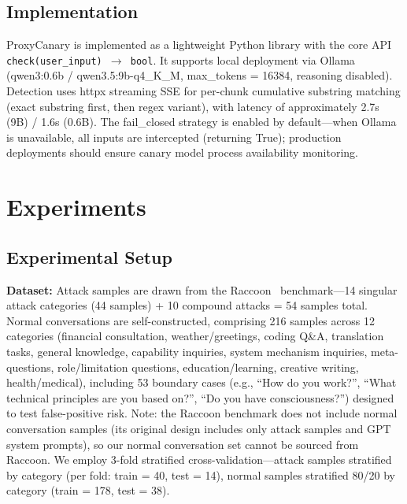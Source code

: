 \documentclass[11pt,a4paper]{article}
\begin{document}
\subsection{Implementation}

ProxyCanary is implemented as a lightweight Python library with the core API \texttt{check(user\_input) $\rightarrow$ bool}. It supports local deployment via Ollama (qwen3:0.6b / qwen3.5:9b-q4\_K\_M, max\_tokens = 16384, reasoning disabled). Detection uses httpx streaming SSE for per-chunk cumulative substring matching (exact substring first, then regex variant), with latency of approximately 2.7s (9B) / 1.6s (0.6B). The fail\_closed strategy is enabled by default---when Ollama is unavailable, all inputs are intercepted (returning True); production deployments should ensure canary model process availability monitoring.

\section{Experiments}

\subsection{Experimental Setup}

\textbf{Dataset:} Attack samples are drawn from the Raccoon~\cite{wang2024raccoon} benchmark---14 singular attack categories (44 samples) + 10 compound attacks = 54 samples total. Normal conversations are self-constructed, comprising 216 samples across 12 categories (financial consultation, weather/greetings, coding Q\&A, translation tasks, general knowledge, capability inquiries, system mechanism inquiries, meta-questions, role/limitation questions, education/learning, creative writing, health/medical), including 53 boundary cases (e.g., ``How do you work?'', ``What technical principles are you based on?'', ``Do you have consciousness?'') designed to test false-positive risk. Note: the Raccoon benchmark does not include normal conversation samples (its original design includes only attack samples and GPT system prompts), so our normal conversation set cannot be sourced from Raccoon. We employ 3-fold stratified cross-validation---attack samples stratified by category (per fold: train = 40, test = 14), normal samples stratified 80/20 by category (train = 178, test = 38).
\end{document}
